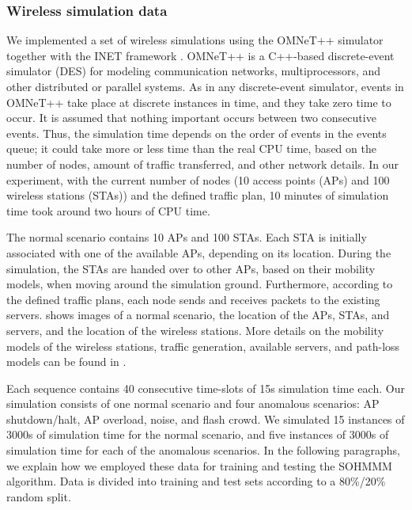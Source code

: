 \subsubsection{Wireless simulation data}
\label{sec:sohmmm_experiment_wifi}

We implemented a set of wireless simulations using the OMNeT++ \cite{omnetpp} simulator together with the INET framework \cite{inet}. OMNeT++ is a C++-based discrete-event simulator (DES) for modeling communication networks, multiprocessors, and other distributed or parallel systems.
As in any discrete-event simulator, events in OMNeT++ take place at discrete instances in time, and they take zero time to occur. It is assumed that nothing important occurs between two consecutive events. Thus, the simulation time depends on the order of events in the events queue; it could take more or less time than the real CPU time, based on the number of nodes, amount of traffic transferred, and other network details. In our experiment, with the current number of nodes (10 access points (APs) and 100 wireless stations (STAs)) and the defined traffic plan, 10 minutes of simulation time took around two hours of CPU time.

The normal scenario contains 10 APs and 100 STAs. Each STA is initially associated with one of the available APs, depending on its location. During the simulation, the STAs are handed over to other APs, based on their mobility models, when moving around the simulation ground. Furthermore, according to the defined traffic plans, each node sends and receives packets to the existing servers.  shows images of a normal scenario, the location of the APs, STAs, and servers, and the location of the wireless stations. More details on the mobility models of the wireless stations, traffic generation, available servers, and path-loss models can be found in \cite{Anisa2017}.

Each sequence contains 40 consecutive time-slots of 15s simulation time each. Our simulation consists of one normal scenario and four anomalous scenarios: AP shutdown/\allowbreak halt, AP overload, noise, and flash crowd. We simulated 15 instances of 3000s of simulation time for the normal scenario, and five instances of 3000s of simulation time for each of the anomalous scenarios. In the following paragraphs, we explain how we employed these data for training and testing the SOHMMM algorithm.
Data is divided into training and test sets according to a 80\%/20\% random split.

